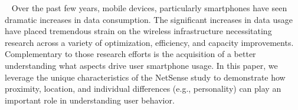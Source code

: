 ~\cite{meng2014analyzing}
Over the past few years, mobile devices, particularly smartphones have seen dramatic increases in data consumption. The significant increases in data usage have placed tremendous strain on the wireless infrastructure necessitating research across a variety of optimization, efficiency, and capacity improvements. Complementary to those research efforts is the acquisition of a better understanding what aspects drive user smartphone usage. In this paper, we leverage the unique characteristics of the NetSense study to demonstrate how proximity, location, and individual differences (e.g., personality) can play an important role in understanding user behavior.

%
%

